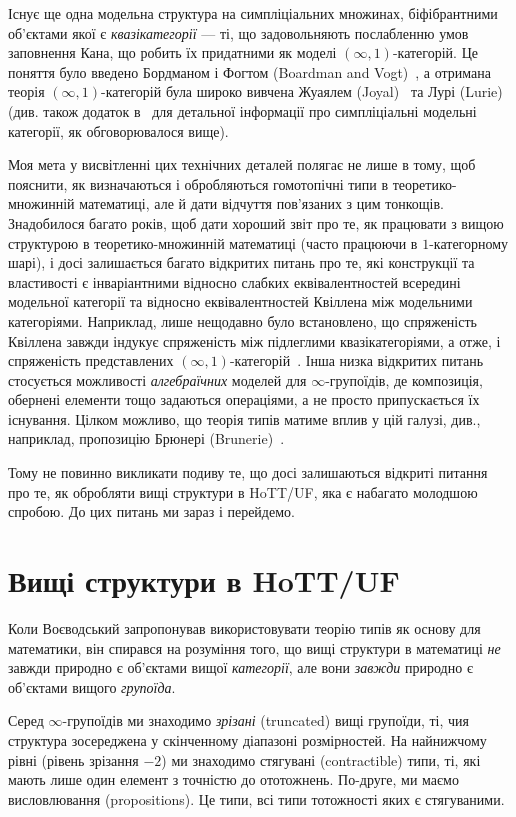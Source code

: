\documentclass[12pt]{article}
\newcommand*{\inftyone}{\ensuremath{(\infty,1)}}
\begin{document}
Існує ще одна модельна структура на симпліціальних множинах, біфібрантними об'єктами якої є \emph{квазікатегорії} — ті, що задовольняють послабленню умов заповнення Кана, що робить їх придатними як моделі \inftyone-категорій. Це поняття було введено Бордманом і Фогтом (Boardman and Vogt)~\cite{BoardmanVogt1973}, а отримана теорія \inftyone-категорій була широко вивчена Жуаялем (Joyal)~\cite{Joyal2002} та Лурі (Lurie)~\cite{LurieHTT} (див. також додаток в~\cite{LurieHTT} для детальної інформації про симпліціальні модельні категорії, як обговорювалося вище).

Моя мета у висвітленні цих технічних деталей полягає не лише в тому, щоб пояснити, як визначаються і обробляються гомотопічні типи в теоретико-множинній математиці, але й дати відчуття пов'язаних з цим тонкощів. Знадобилося багато років, щоб дати хороший звіт про те, як працювати з вищою структурою в теоретико-множинній математиці (часто працюючи в $1$-категорному шарі), і досі залишається багато відкритих питань про те, які конструкції та властивості є інваріантними відносно слабких еквівалентностей всередині модельної категорії та відносно еквівалентностей Квіллена між модельними категоріями. Наприклад, лише нещодавно було встановлено, що спряженість Квіллена завжди індукує спряженість між підлеглими квазікатегоріями, а отже, і спряженість представлених \inftyone-категорій~\cite{MazelGee2016}. Інша низка відкритих питань стосується можливості \emph{алгебраїчних} моделей для $\infty$-групоїдів, де композиція, обернені елементи тощо задаються операціями, а не просто припускається їх існування. Цілком можливо, що теорія типів матиме вплив у цій галузі, див., наприклад, пропозицію Брюнері (Brunerie)~\cite[Додаток]{Brunerie2016}.

Тому не повинно викликати подиву те, що досі залишаються відкриті питання про те, як обробляти вищі структури в HoTT/UF, яка є набагато молодшою спробою. До цих питань ми зараз і перейдемо.

\section{Вищі структури в HoTT/UF}
\label{sec:problems}

Коли Воєводський запропонував використовувати теорію типів як основу для математики, він спирався на розуміння того, що вищі структури в математиці \emph{не} завжди природно є об'єктами вищої \emph{категорії}, але вони \emph{завжди} природно є об'єктами вищого \emph{групоїда}.

Серед $\infty$-групоїдів ми знаходимо \emph{зрізані} (truncated) вищі групоїди, ті, чия структура зосереджена у скінченному діапазоні розмірностей. На найнижчому рівні (рівень зрізання $-2$) ми знаходимо стягувані (contractible) типи, ті, які мають лише один елемент з точністю до ототожнень. По-друге, ми маємо висловлювання (propositions). Це типи, всі типи тотожності яких є стягуваними.
\end{document}
